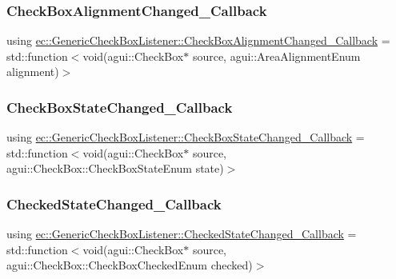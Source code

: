 \subsubsection{\texorpdfstring{Check\+Box\+Alignment\+Changed\+\_\+\+Callback}{CheckBoxAlignmentChanged\_Callback}}
{\footnotesize\ttfamily using \mbox{\hyperlink{classec_1_1_generic_check_box_listener_a9b20541580dce7b3a1818b62524d2c6a}{ec\+::\+Generic\+Check\+Box\+Listener\+::\+Check\+Box\+Alignment\+Changed\+\_\+\+Callback}} =  std\+::function$<$void(agui\+::\+Check\+Box$\ast$ source, agui\+::\+Area\+Alignment\+Enum alignment)$>$}

\mbox{\label{classec_1_1_generic_check_box_listener_a2737c54ec6c92a1bebda7961c6bb1852}} 
\subsubsection{\texorpdfstring{Check\+Box\+State\+Changed\+\_\+\+Callback}{CheckBoxStateChanged\_Callback}}
{\footnotesize\ttfamily using \mbox{\hyperlink{classec_1_1_generic_check_box_listener_a2737c54ec6c92a1bebda7961c6bb1852}{ec\+::\+Generic\+Check\+Box\+Listener\+::\+Check\+Box\+State\+Changed\+\_\+\+Callback}} =  std\+::function$<$void(agui\+::\+Check\+Box$\ast$ source, agui\+::\+Check\+Box\+::\+Check\+Box\+State\+Enum state)$>$}

\mbox{\label{classec_1_1_generic_check_box_listener_ad1cc68469820c8bb79f278f70a8dfbe4}} 
\subsubsection{\texorpdfstring{Checked\+State\+Changed\+\_\+\+Callback}{CheckedStateChanged\_Callback}}
{\footnotesize\ttfamily using \mbox{\hyperlink{classec_1_1_generic_check_box_listener_ad1cc68469820c8bb79f278f70a8dfbe4}{ec\+::\+Generic\+Check\+Box\+Listener\+::\+Checked\+State\+Changed\+\_\+\+Callback}} =  std\+::function$<$void(agui\+::\+Check\+Box$\ast$ source, agui\+::\+Check\+Box\+::\+Check\+Box\+Checked\+Enum checked)$>$}

